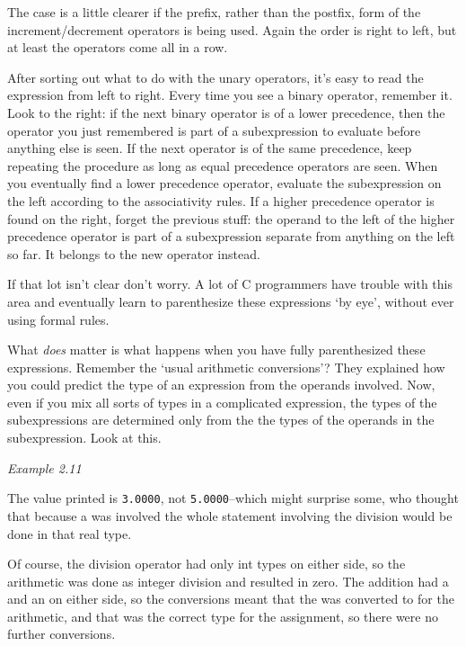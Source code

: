    The case is a little clearer if the prefix, rather than the postfix,
    form of the increment/decrement operators is being used. Again the order
    is right to left, but at least the operators come all in a row.


   After sorting out what to do with the unary operators, it's easy to read
    the expression from left to right. Every time you see a binary operator,
    remember it. Look to the right: if the next binary operator is of a lower
    precedence, then the operator you just remembered is part of a
    subexpression to evaluate before anything else is seen. If the next
    operator is of the same precedence, keep repeating the procedure as long
    as equal precedence operators are seen. When you eventually find a lower
    precedence operator, evaluate the subexpression on the left according to
    the associativity rules. If a higher precedence operator is found on the
    right, forget the previous stuff: the operand to the left of the higher
    precedence operator is part of a subexpression separate from anything on
    the left so far. It belongs to the new operator instead.


   If that lot isn't clear don't worry. A lot of C programmers have
    trouble with this area and eventually learn to parenthesize these
    expressions `by eye', without ever using formal rules.


   What \textit{does} matter is what happens when you have fully
    parenthesized these expressions. Remember the `usual arithmetic
    conversions'? They explained how you could predict the type of an
    expression from the operands involved. Now, even if you mix all sorts of
    types in a complicated expression, the types of the subexpressions are
    determined only from the the types of the operands in the subexpression.
    Look at this.


   \begin{center}\textit{Example 2.11}\end{center}


   The value printed is \texttt{3.0000},
    not \texttt{5.0000}--which might surprise some, who thought
    that because a \float{} was involved the whole statement
    involving the division would be done in that real type.


   Of course, the division operator had only int types on either side, so
    the arithmetic was done as integer division and resulted in zero. The
    addition had a \float{} and an \kint{} on either side,
    so the conversions meant that the \kint{} was converted to
    \float{} for the arithmetic, and that was the correct type for
    the assignment, so there were no further conversions.


